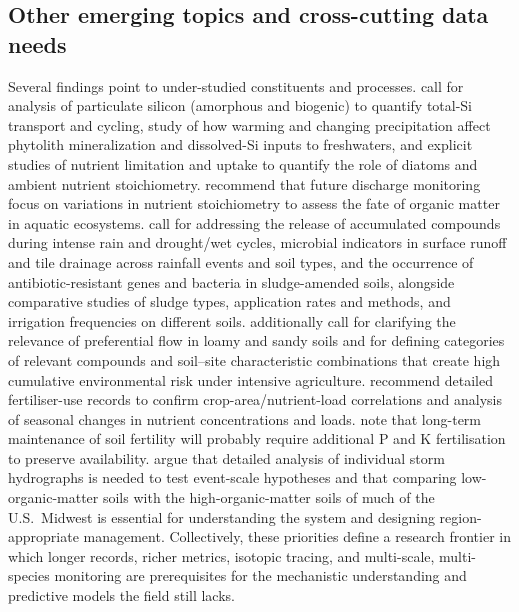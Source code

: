 \subsection{Other emerging topics and cross-cutting data needs}

Several findings point to under-studied constituents and processes. \textcite{Sethna2022} call for analysis of particulate silicon (amorphous and biogenic) to quantify total-Si transport and cycling, study of how warming and changing precipitation affect phytolith mineralization and dissolved-Si inputs to freshwaters, and explicit studies of nutrient limitation and uptake to quantify the role of diatoms and ambient nutrient stoichiometry. \textcite{Manninen2023} recommend that future discharge monitoring focus on variations in nutrient stoichiometry to assess the fate of organic matter in aquatic ecosystems. \textcite{Ghirardini2019} call for addressing the release of accumulated compounds during intense rain and drought/wet cycles, microbial indicators in surface runoff and tile drainage across rainfall events and soil types, and the occurrence of antibiotic-resistant genes and bacteria in sludge-amended soils, alongside comparative studies of sludge types, application rates and methods, and irrigation frequencies on different soils. \textcite{Gramlich2018} additionally call for clarifying the relevance of preferential flow in loamy and sandy soils and for defining categories of relevant compounds and soil--site characteristic combinations that create high cumulative environmental risk under intensive agriculture. \textcite{DambenieceMigliniece2018} recommend detailed fertiliser-use records to confirm crop-area/nutrient-load correlations and analysis of seasonal changes in nutrient concentrations and loads. \textcite{Norberg2025} note that long-term maintenance of soil fertility will probably require additional P and K fertilisation to preserve availability. \textcite{Kladivko2004} argue that detailed analysis of individual storm hydrographs is needed to test event-scale hypotheses and that comparing low-organic-matter soils with the high-organic-matter soils of much of the U.S.\ Midwest is essential for understanding the system and designing region-appropriate management. Collectively, these priorities define a research frontier in which longer records, richer metrics, isotopic tracing, and multi-scale, multi-species monitoring are prerequisites for the mechanistic understanding and predictive models the field still lacks.